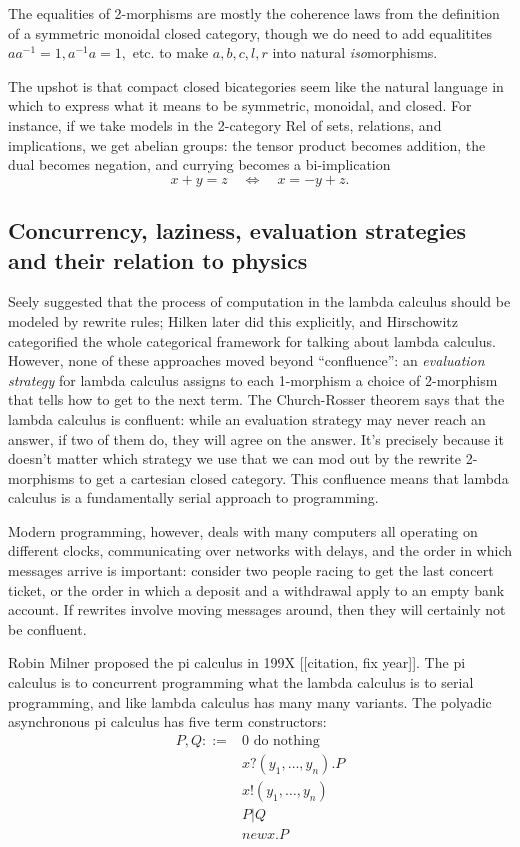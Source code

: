\documentclass[12pt,twoside,openright]{report}
\begin{document}
The equalities of 2-morphisms are mostly the coherence laws from the definition of a symmetric monoidal closed category, though we do need to add equalitites $aa^{-1} = 1, a^{-1}a = 1,$ etc. to make $a,b,c,l,r$ into natural {\em iso}morphisms.

The upshot is that compact closed bicategories seem like the natural language in which to express what it means to be symmetric, monoidal, and closed.  For instance, if we take models in the 2-category Rel of sets, relations, and implications, we get abelian groups: the tensor product becomes addition, the dual becomes negation, and currying becomes a bi-implication
\[ x + y = z \quad \iff \quad x = -y + z. \]

\subsection{Concurrency, laziness, evaluation strategies and their relation to physics}
Seely \cite{Seely} suggested that the process of computation in the lambda calculus should be modeled by rewrite rules; Hilken \cite{Hilken} later did this explicitly, and Hirschowitz \cite{Hirschowitz} categorified the whole categorical framework for talking about lambda calculus.  However, none of these approaches moved beyond ``confluence'': an {\sl evaluation strategy} for lambda calculus assigns to each 1-morphism a choice of 2-morphism that tells how to get to the next term.  The Church-Rosser theorem says that the lambda calculus is confluent: while an evaluation strategy may never reach an answer, if two of them do, they will agree on the answer.  It's precisely because it doesn't matter which strategy we use that we can mod out by the rewrite 2-morphisms to get a cartesian closed category.  This confluence means that lambda calculus is a fundamentally serial approach to programming.

Modern programming, however, deals with many computers all operating on different clocks, communicating over networks with delays, and the order in which messages arrive is important: consider two people racing to get the last concert ticket, or the order in which a deposit and a withdrawal apply to an empty bank account.  If rewrites involve moving messages around, then they will certainly not be confluent.

Robin Milner proposed the pi calculus in 199X [[citation, fix year]].  The pi calculus is to concurrent programming what the lambda calculus is to serial programming, and like lambda calculus has many many variants.  The polyadic asynchronous pi calculus has five term constructors:
\[\begin{array}{rl}
  P,Q ::= & 0 \mbox{ do nothing} \\
  & x?(y_1, \ldots, y_n).P \\
  & x!(y_1, \ldots, y_n) \\
  & P | Q \\
  & new x.P
\end{array}\]
\end{document}
